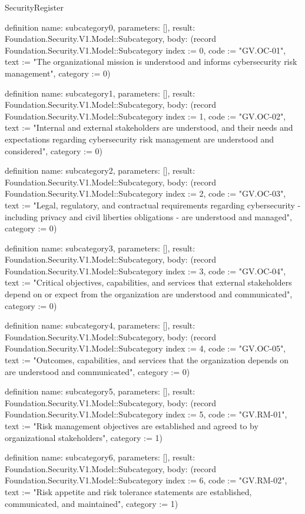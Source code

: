 \begin{lexlean}{SecurityRegister}
\begin{semanticmodule}
definition{
  name: subcategory0,
  parameters: [],
  result: Foundation.Security.V1.Model::Subcategory,
  body: (record Foundation.Security.V1.Model::Subcategory {index := 0, code := "GV.OC-01", text := "The organizational mission is understood and informs cybersecurity risk management", category := 0})
}

definition{
  name: subcategory1,
  parameters: [],
  result: Foundation.Security.V1.Model::Subcategory,
  body: (record Foundation.Security.V1.Model::Subcategory {index := 1, code := "GV.OC-02", text := "Internal and external stakeholders are understood, and their needs and expectations regarding cybersecurity risk management are understood and considered", category := 0})
}

definition{
  name: subcategory2,
  parameters: [],
  result: Foundation.Security.V1.Model::Subcategory,
  body: (record Foundation.Security.V1.Model::Subcategory {index := 2, code := "GV.OC-03", text := "Legal, regulatory, and contractual requirements regarding cybersecurity - including privacy and civil liberties obligations - are understood and managed", category := 0})
}

definition{
  name: subcategory3,
  parameters: [],
  result: Foundation.Security.V1.Model::Subcategory,
  body: (record Foundation.Security.V1.Model::Subcategory {index := 3, code := "GV.OC-04", text := "Critical objectives, capabilities, and services that external stakeholders depend on or expect from the organization are understood and communicated", category := 0})
}

definition{
  name: subcategory4,
  parameters: [],
  result: Foundation.Security.V1.Model::Subcategory,
  body: (record Foundation.Security.V1.Model::Subcategory {index := 4, code := "GV.OC-05", text := "Outcomes, capabilities, and services that the organization depends on are understood and communicated", category := 0})
}

definition{
  name: subcategory5,
  parameters: [],
  result: Foundation.Security.V1.Model::Subcategory,
  body: (record Foundation.Security.V1.Model::Subcategory {index := 5, code := "GV.RM-01", text := "Risk management objectives are established and agreed to by organizational stakeholders", category := 1})
}

definition{
  name: subcategory6,
  parameters: [],
  result: Foundation.Security.V1.Model::Subcategory,
  body: (record Foundation.Security.V1.Model::Subcategory {index := 6, code := "GV.RM-02", text := "Risk appetite and risk tolerance statements are established, communicated, and maintained", category := 1})
}


\end{semanticmodule}
\end{lexlean}
